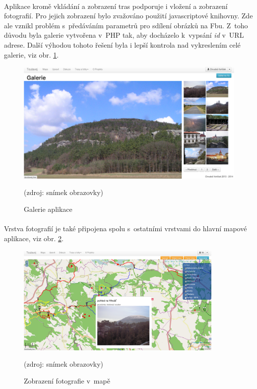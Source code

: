 \documentclass[11pt,a4paper,titlepage,oneside]{book}
\begin{document}
			\paragraph{} Aplikace kromě vkládání a zobrazení tras podporuje i vložení a zobrazení fotografií. Pro jejich zobrazení bylo zvažováno použití javascriptové knihovny. Zde ale vznikl problém s~předáváním parametrů pro sdílení obrázků na \acl{Fb}u. Z~toho důvodu byla galerie vytvořena v~PHP tak, aby docházelo k~vypsání \textit{id} v~URL adrese. Další výhodou tohoto řešení byla i lepší kontrola nad vykreslením celé galerie, viz obr. \ref{fig:gallery}.
		\begin{figure}[!h]
			\begin{center}
				\includegraphics[width=12cm]{obrazky/toulavej/gallery.png}
				\caption{Galerie aplikace }
				\label{fig:gallery}
				(zdroj: snímek obrazovky)
			\end{center}
		\end{figure}
			\paragraph{} Vrstva fotografií je také připojena spolu s~ostatními vrstvami do hlavní mapové aplikace, viz obr. \ref{fig:vlhost}.

		\begin{figure}[!h]
			\begin{center}
				\includegraphics[width=10cm]{obrazky/toulavej/mapa2_vlhost.png}
				\caption{Zobrazení fotografie v~mapě}
				\label{fig:vlhost}
				(zdroj: snímek obrazovky)
			\end{center}
		\end{figure}	
\end{document}
